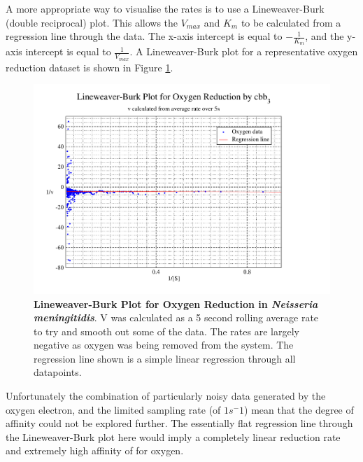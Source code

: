 A more appropriate way to visualise the rates is to use a Lineweaver-Burk (double reciprocal) plot. This allows the $V_{max}$ and $K_m$ to be calculated from a regression line through the data. The x-axis intercept is equal to $-\frac{1}{K_m}$, and the y-axis intercept is equal to $\frac{1}{V_{max}}$. A Lineweaver-Burk plot for a representative oxygen reduction dataset is shown in Figure \ref{fig:o2lb}.
\begin{figure}[ht]
 \centering
 \includegraphics[width=14cm, trim=1cm 1cm 4cm 0.5cm, clip=true]{./appendix/data/lbplot.pdf}
 \caption[{Lineweaver-Burk Plot for Oxygen Reduction in \textit{Neisseria meningitidis}.}]{{\bf Lineweaver-Burk Plot for Oxygen Reduction in \textit{Neisseria meningitidis}}. V was calculated as a 5 second rolling average rate to try and smooth out some of the data. The rates are largely negative as oxygen was being removed from the system. The regression line shown is a simple linear regression through all datapoints.
 \label{fig:o2lb}}
\end{figure}

Unfortunately the combination of particularly noisy data generated by the oxygen electron, and the limited sampling rate (of $1 s^-1$) mean that the degree of affinity could not be explored further. The essentially flat regression line through the Lineweaver-Burk plot here would imply a completely linear reduction rate and extremely high affinity of \cbbthree{} for oxygen.